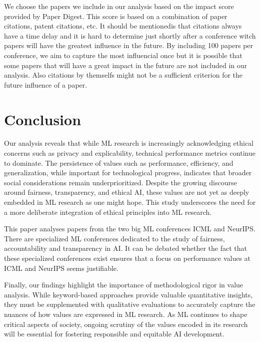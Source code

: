 \documentclass{article}
\begin{document}
We choose the papers we include in our analysis based on the impact score provided by Paper Digest. This score is based on a combination of paper citations, patent citations, etc. It should be mentionedis that
citations always have a time delay and it is hard to determine just shortly after a conference witch papers will have the greatest influence in the future. By including 100 papers per conference, we aim to 
capture the most influencial once but it is possible that some papers that will have a great impact in the future are not included in our analysis. Also citations by themselfs might not be a sufficient criterion for the future influence of a paper. 

\section{Conclusion}
Our analysis reveals that while ML research is increasingly acknowledging ethical concerns such as privacy and explicability, technical performance metrics continue to dominate. 
The persistence of values such as performance, efficiency, and generalization, while important for technological progress, indicates that broader social considerations remain underprioritized. 
Despite the growing discourse around fairness, transparency, and ethical AI, these values are not yet as deeply embedded in ML research as one might hope. 
This study underscores the need for a more deliberate integration of ethical principles into ML research.

This paper analyses papers from the two big ML conferences ICML and NeurIPS. There are specialized ML conferences dedicated to the study of fairness, accountability and transparency in AI. It can be debated whether the fact that these specialized conferences exist ensures that a focus on performance values at ICML and NeurIPS seems justifiable. 

Finally, our findings highlight the importance of methodological rigor in value analysis. While keyword-based approaches provide valuable quantitative insights, they must be supplemented with 
qualitative evaluations to accurately capture the nuances of how values are expressed in ML research. As ML continues to shape critical aspects of society, ongoing scrutiny of the values encoded in its 
research will be essential for fostering responsible and equitable AI development.






\end{document}
